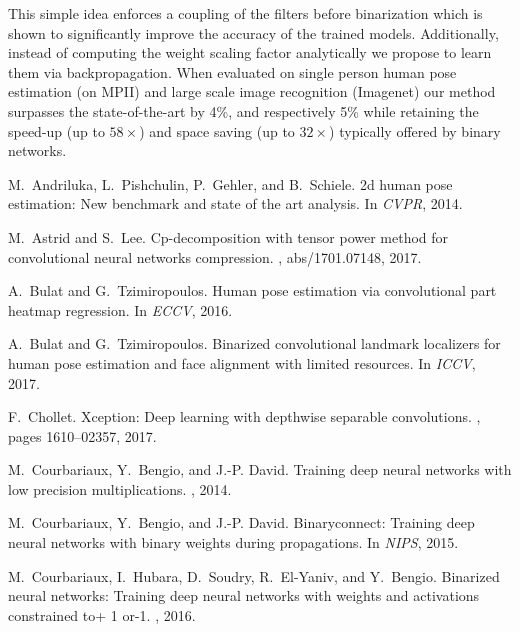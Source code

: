 \documentclass[10pt,twocolumn,letterpaper]{article}
\begin{document}
This simple idea enforces a coupling of the filters before binarization which is shown to significantly improve the accuracy of the trained models. Additionally, instead of computing the weight scaling factor analytically we propose to learn them via backpropagation. When evaluated on single person human pose estimation (on MPII) and large scale image recognition (Imagenet) our method surpasses the state-of-the-art by 4\%, and respectively 5\% while retaining the speed-up (up to $58\times$) and space saving (up to $32\times$) typically offered by binary networks.
 
{\small

\begin{thebibliography}{10}\itemsep=-1pt

M.~Andriluka, L.~Pishchulin, P.~Gehler, and B.~Schiele.
\newblock 2d human pose estimation: New benchmark and state of the art
  analysis.
\newblock In {\em CVPR}, 2014.

M.~Astrid and S.~Lee.
\newblock Cp-decomposition with tensor power method for convolutional neural
  networks compression.
, abs/1701.07148, 2017.

A.~Bulat and G.~Tzimiropoulos.
\newblock Human pose estimation via convolutional part heatmap regression.
\newblock In {\em ECCV}, 2016.

A.~Bulat and G.~Tzimiropoulos.
\newblock Binarized convolutional landmark localizers for human pose estimation
  and face alignment with limited resources.
\newblock In {\em ICCV}, 2017.

F.~Chollet.
\newblock Xception: Deep learning with depthwise separable convolutions.
, pages 1610--02357, 2017.

M.~Courbariaux, Y.~Bengio, and J.-P. David.
\newblock Training deep neural networks with low precision multiplications.
, 2014.

M.~Courbariaux, Y.~Bengio, and J.-P. David.
\newblock Binaryconnect: Training deep neural networks with binary weights
  during propagations.
\newblock In {\em NIPS}, 2015.

M.~Courbariaux, I.~Hubara, D.~Soudry, R.~El-Yaniv, and Y.~Bengio.
\newblock Binarized neural networks: Training deep neural networks with weights
  and activations constrained to+ 1 or-1.
, 2016.


\end{thebibliography}}
\end{document}
